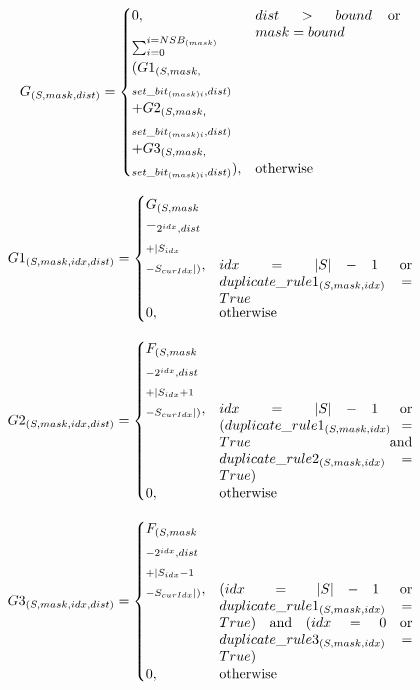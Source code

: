 \begin{equation}
G_{(S, mask, dist)} = 
\begin{cases}
0, & \parbox[t]{.3\textwidth}{$dist > bound$ or $mask = bound$}\\
\sum_{i=0}^{i=NSB_{(mask)}}\\
(G1_{(S, mask,} \\_{set\_bit_{(mask)i}, dist)}\\
+ G2_{(S, mask,} \\_{set\_bit_{(mask)i}, dist)}\\
+ G3_{(S, mask,} \\_{set\_bit_{(mask)i}, dist)}), & \text{otherwise}
\end{cases}
\label{equation:relasi_rekurens_fungsi_g}	
\end{equation}

\begin{equation}
G1_{(S, mask, idx, dist)} = 
\begin{cases}
G_{(S, mask}\\-_{2^{idx}, dist}\\_{+|S_{idx}}\\_{-S_{curIdx}|)}, & \parbox[t]{.4\textwidth}{$idx=|S|-1$ or $duplicate\_rule1_{(S, mask, idx)} = True$}\\
0, & \text{otherwise}
\end{cases}
\label{equation:relasi_rekurens_fungsi_g1}
\end{equation}

\begin{equation}
G2_{(S, mask, idx, dist)} = 
\begin{cases}
F_{(S, mask}\\_{-2^{idx}, dist}\\_{+|S_{idx}+1}\\_{-S_{curIdx}|)}, & \parbox[t]{.4\textwidth}{$idx=|S|-1$ or ($duplicate\_rule1_{(S, mask, idx)} = True$ and $duplicate\_rule2_{(S, mask, idx)} = True$)}\\
0, & \text{otherwise}
\end{cases}
\label{equation:relasi_rekurens_fungsi_g2}
\end{equation}

\begin{equation}
G3_{(S, mask, idx, dist)} = 
\begin{cases}
F_{(S, mask}\\_{-2^{idx}, dist}\\_{+|S_{idx}-1}\\_{-S_{curIdx}|)}, & \parbox[t]{.4\textwidth}{($idx=|S|-1$ or $duplicate\_rule1_{(S, mask, idx)} = True$) and ($idx=0$ or $duplicate\_rule3_{(S, mask, idx)} = True$)}\\
0, & \text{otherwise}
\end{cases}
\label{equation:relasi_rekurens_fungsi_g3}
\end{equation}

